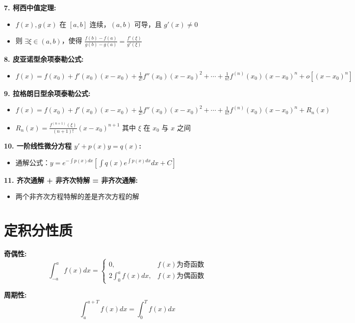 \documentclass[10pt]{article}
\begin{document}
\begin{multicols*}{2}
\textbf{7. 柯西中值定理:}
\begin{itemize}
  \item \(f(x), g(x)\) 在 \([a, b]\) 连续，\((a, b)\) 可导，且 \(g'(x) \neq 0\)
  \item 则 \(\exists \xi \in (a, b)\)，使得 \(\frac{f(b) - f(a)}{g(b) - g(a)} = \frac{f'(\xi)}{g'(\xi)}\)
\end{itemize}

\textbf{8. 皮亚诺型余项泰勒公式:}
\begin{itemize}
  \item \(f(x) = f(x_0) + f'(x_0)(x - x_0) + \frac{1}{2!}f''(x_0)(x - x_0)^2 + \cdots + \frac{1}{n!}f^{(n)}(x_0)(x - x_0)^n + o[(x - x_0)^n]\)
\end{itemize}

\textbf{9. 拉格朗日型余项泰勒公式:}
\begin{itemize}
  \item \(f(x) = f(x_0) + f'(x_0)(x - x_0) + \frac{1}{2!}f''(x_0)(x - x_0)^2 + \cdots + \frac{1}{n!}f^{(n)}(x_0)(x - x_0)^n + R_n(x)\)
  \item \(R_n(x) = \frac{f^{(n+1)}(\xi)}{(n+1)!}(x - x_0)^{n+1}\) 其中 \(\xi\) 在 \(x_0\) 与 \(x\) 之间
\end{itemize}

\textbf{10. 一阶线性微分方程 \(y' + p(x)y = q(x)\):}
\begin{itemize}
  \item 通解公式：\(y = e^{-\int p(x)dx} \left[ \int q(x) e^{\int p(x)dx} dx + C \right]\)
\end{itemize}

\textbf{11. 齐次通解 + 非齐次特解 = 非齐次通解:}
\begin{itemize}
  \item 两个非齐次方程特解的差是齐次方程的解
\end{itemize}

\section*{定积分性质}
\vspace{-8pt}

\textbf{奇偶性:}
\[\int_{-a}^a f(x)dx = \begin{cases} 
0, & f(x) \text{为奇函数} \\
2\int_0^a f(x)dx, & f(x) \text{为偶函数}
\end{cases}\]

\textbf{周期性:}
\[\int_a^{a+T} f(x)dx = \int_0^T f(x)dx\]


\end{multicols*}
\end{document}
